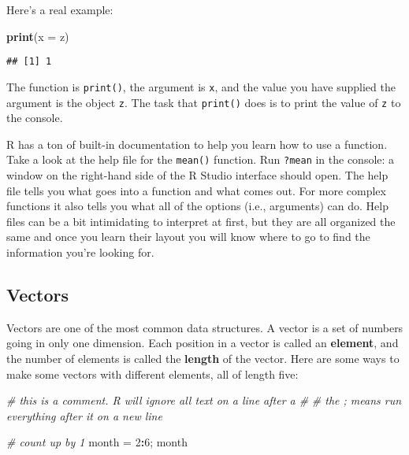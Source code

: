 \documentclass[]{book}
\newenvironment{Shaded}{\begin{snugshade}}{\end{snugshade}}
\newcommand{\CommentTok}[1]{\textcolor[rgb]{0.56,0.35,0.01}{\textit{#1}}}
\newcommand{\DataTypeTok}[1]{\textcolor[rgb]{0.13,0.29,0.53}{#1}}
\newcommand{\DecValTok}[1]{\textcolor[rgb]{0.00,0.00,0.81}{#1}}
\newcommand{\KeywordTok}[1]{\textcolor[rgb]{0.13,0.29,0.53}{\textbf{#1}}}
\newcommand{\NormalTok}[1]{#1}
\newcommand{\OperatorTok}[1]{\textcolor[rgb]{0.81,0.36,0.00}{\textbf{#1}}}
\newcommand{\StringTok}[1]{\textcolor[rgb]{0.31,0.60,0.02}{#1}}
\begin{document}
Here's a real example:

\begin{Shaded}
\begin{Highlighting}[]
\KeywordTok{print}\NormalTok{(}\DataTypeTok{x =}\NormalTok{ z)}
\end{Highlighting}
\end{Shaded}

\begin{verbatim}
## [1] 1
\end{verbatim}

The function is \texttt{print()}, the argument is \texttt{x}, and the value you have supplied the argument is the object \texttt{z}. The task that \texttt{print()} does is to print the value of \texttt{z} to the console.

R has a ton of built-in documentation to help you learn how to use a function. Take a look at the help file for the \texttt{mean()} function. Run \texttt{?mean} in the console: a window on the right-hand side of the R Studio interface should open. The help file tells you what goes into a function and what comes out. For more complex functions it also tells you what all of the options (i.e., arguments) can do. Help files can be a bit intimidating to interpret at first, but they are all organized the same and once you learn their layout you will know where to go to find the information you're looking for.

\hypertarget{vectors}{%
\subsection{Vectors}\label{vectors}}

Vectors are one of the most common data structures. A vector is a set of numbers going in only one dimension. Each position in a vector is called an \textbf{element}, and the number of elements is called the \textbf{length} of the vector. Here are some ways to make some vectors with different elements, all of length five:

\begin{Shaded}
\begin{Highlighting}[]
\CommentTok{# this is a comment. R will ignore all text on a line after a #}
\CommentTok{# the ; means run everything after it on a new line}

\CommentTok{# count up by 1}
\NormalTok{month =}\StringTok{ }\DecValTok{2}\OperatorTok{:}\DecValTok{6}\NormalTok{; month}
\end{Highlighting}
\end{Shaded}
\end{document}
